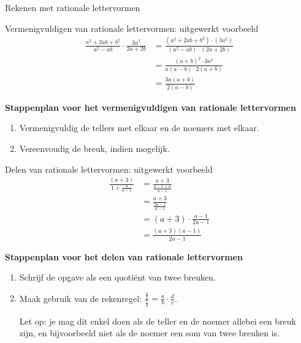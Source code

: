 \begin{lesactiviteit}{Rekenen met rationale lettervormen}
\begin{kader}{}{Vermenigvuldigen van rationale lettervormen: uitgewerkt voorbeeld}
	\begin{align*}
		\frac{a^2+2ab+b^2}{a^2-ab}\cdot \frac{3a^2}{2a+2b}&=\frac{(a^2+2ab+b^2)\cdot(3a^2)}{(a^2-ab)\cdot (2a+2b)}\\
		&=\frac{(a+b)^2\cdot 3a^2}{a(a-b)\cdot 2(a+b)}\\
		&=\frac{3a(a+b)}{2(a-b)}
	\end{align*}
\end{kader}	
\textbf{Stappenplan voor het vermenigvuldigen van rationale lettervormen}
\begin{enumerate}
	\item Vermenigvuldig de tellers met elkaar en de noemers met elkaar.
	\item Vereenvoudig de breuk, indien mogelijk.
\end{enumerate}
\vspace{1cm}
		

\begin{kader}{}{Delen van rationale lettervormen: uitgewerkt voorbeeld}
	\begin{align*}
		\frac{(a+3)}{1+\frac{a}{a-1}}&=\frac{a+3}{\frac{a-1+a}{a-1}}\\
		&=\frac{a+3}{\frac{2a-1}{a-1}}\\
		&=(a+3)\cdot \frac{a-1}{2a-1}\\
		&=\frac{(a+3)(a-1)}{2a-1}		
	\end{align*}
\end{kader}	
\textbf{Stappenplan voor het delen van rationale lettervormen}
\begin{enumerate}
	\item Schrijf de opgave als een quotiënt van twee breuken.
	\item Maak gebruik van de rekenregel: $\displaystyle \frac{\frac{a}{b}}{\frac{c}{d}}= \frac{a}{b} \cdot \frac{d}{c}$.
	
	Let op: je mag dit enkel doen als de teller en de noemer allebei een breuk zijn, en bijvoorbeeld niet als de noemer een som van twee breuken is.
\end{enumerate}
\end{lesactiviteit}

